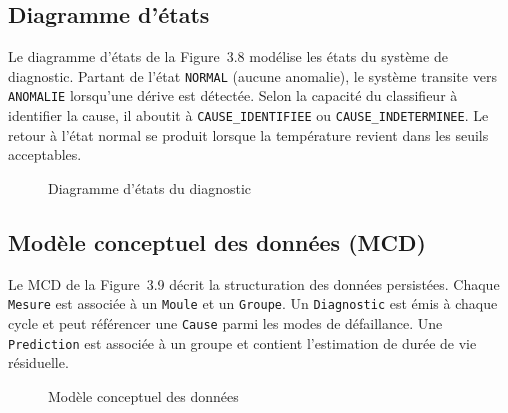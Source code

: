 \subsection{Diagramme d'états}

Le diagramme d'états de la Figure~3.8 modélise les états du système de diagnostic. Partant de l'état \texttt{NORMAL} (aucune anomalie), le système transite vers \texttt{ANOMALIE} lorsqu'une dérive est détectée. Selon la capacité du classifieur à identifier la cause, il aboutit à \texttt{CAUSE\_IDENTIFIEE} ou \texttt{CAUSE\_INDETERMINEE}. Le retour à l'état normal se produit lorsque la température revient dans les seuils acceptables.

\begin{figure}[htbp]
  \centering
  \caption{Diagramme d'états du diagnostic}
\end{figure}


\subsection{Modèle conceptuel des données (MCD)}

Le MCD de la Figure~3.9 décrit la structuration des données persistées. Chaque \texttt{Mesure} est associée à un \texttt{Moule} et un \texttt{Groupe}. Un \texttt{Diagnostic} est émis à chaque cycle et peut référencer une \texttt{Cause} parmi les modes de défaillance. Une \texttt{Prediction} est associée à un groupe et contient l'estimation de durée de vie résiduelle.

\begin{figure}[htbp]
  \centering
  \caption{Modèle conceptuel des données}
\end{figure}


